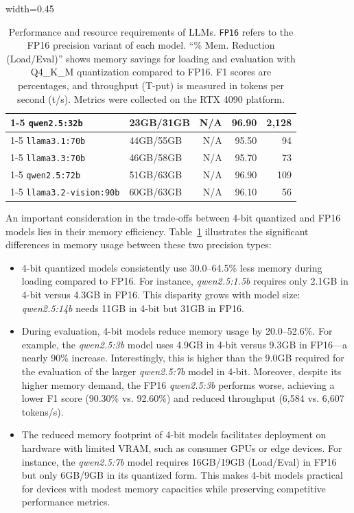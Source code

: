 \documentclass[conference]{IEEEtran}
\begin{document}
\begin{table}[htbp]
\begin{adjustbox}{width=0.45\textwidth}
\begin{tabular}{llrrr}
\cmidrule(lr){1-5}
\texttt{qwen2.5:32b} & 23GB/31GB & N/A & 96.90 & 2,128 \\
\cmidrule(lr){1-5}
\texttt{llama3.1:70b} & 44GB/55GB & N/A & 95.50 & 94 \\
\cmidrule(lr){1-5}
\texttt{llama3.3:70b} & 46GB/58GB & N/A & 95.70 & 73 \\
\cmidrule(lr){1-5}
\texttt{qwen2.5:72b} & 51GB/63GB & N/A & 96.90 & 109 \\
\cmidrule(lr){1-5}
\texttt{llama3.2-vision:90b} & 60GB/63GB & N/A & 96.10 & 56 \\
\bottomrule
\end{tabular}
\end{adjustbox}
\caption{Performance and resource requirements of LLMs. \texttt{FP16} refers to the FP16 precision variant of each model. “\% Mem. Reduction (Load/Eval)” shows memory savings for loading and evaluation with Q4\_K\_M quantization compared to FP16. F1 scores are percentages, and throughput (T-put) is measured in tokens per second (t/s). Metrics were collected on the RTX 4090 platform.}
\label{tab:model_memory_footprints}
\end{table}

An important consideration in the trade-offs between 4-bit quantized and FP16 models lies in their memory efficiency. Table~\ref{tab:model_memory_footprints} illustrates the significant differences in memory usage between these two precision types:

\begin{itemize}
    \item 4-bit quantized models consistently use 30.0--64.5\% less memory during loading compared to FP16. For instance, \textit{qwen2.5:1.5b} requires only 2.1GB in 4-bit versus 4.3GB in FP16. This disparity grows with model size: \textit{qwen2.5:14b} needs 11GB in 4-bit but 31GB in FP16.

    \item During evaluation, 4-bit models reduce memory usage by 20.0--52.6\%. For example, the \textit{qwen2.5:3b} model uses 4.9GB in 4-bit versus 9.3GB in FP16—a nearly 90\% increase. Interestingly, this is higher than the 9.0GB required for the evaluation of the larger \textit{qwen2.5:7b} model in 4-bit. Moreover, despite its higher memory demand, the FP16 \textit{qwen2.5:3b} performs worse, achieving a lower F1 score (90.30\% vs. 92.60\%) and reduced throughput (6,584 vs. 6,607 tokens/s).

    \item The reduced memory footprint of 4-bit models facilitates deployment on hardware with limited VRAM, such as consumer GPUs or edge devices. For instance, the \textit{qwen2.5:7b} model requires 16GB/19GB (Load/Eval) in FP16 but only 6GB/9GB in its quantized form. This makes 4-bit models practical for devices with modest memory capacities while preserving competitive performance metrics.
\end{itemize}
\end{document}
